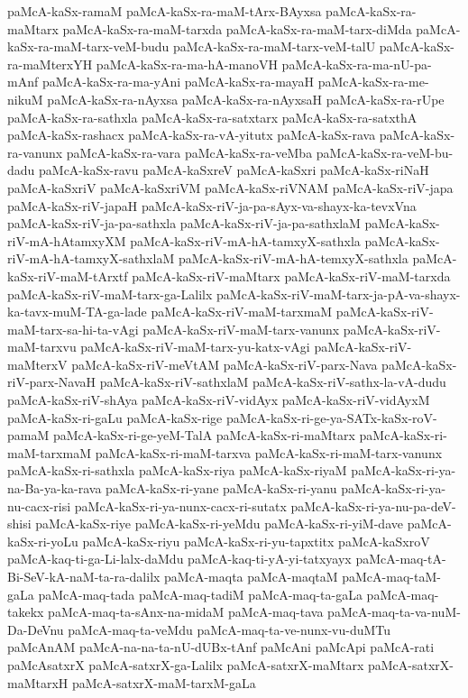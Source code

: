 {paMcA-kaSx-ramaM
paMcA-kaSx-ra-maM-tArx-BAyxsa
paMcA-kaSx-ra-maMtarx
paMcA-kaSx-ra-maM-tarxda
paMcA-kaSx-ra-maM-tarx-diMda
paMcA-kaSx-ra-maM-tarx-veM-budu
paMcA-kaSx-ra-maM-tarx-veM-talU
paMcA-kaSx-ra-maMterxYH
paMcA-kaSx-ra-ma-hA-manoVH
paMcA-kaSx-ra-ma-nU-pa-mAnf
paMcA-kaSx-ra-ma-yAni
paMcA-kaSx-ra-mayaH
paMcA-kaSx-ra-me-nikuM
paMcA-kaSx-ra-nAyxsa
paMcA-kaSx-ra-nAyxsaH
paMcA-kaSx-ra-rUpe
paMcA-kaSx-ra-sathxla
paMcA-kaSx-ra-satxtarx
paMcA-kaSx-ra-satxthA
paMcA-kaSx-rashacx
paMcA-kaSx-ra-vA-yitutx
paMcA-kaSx-rava
paMcA-kaSx-ra-vanunx
paMcA-kaSx-ra-vara
paMcA-kaSx-ra-veMba
paMcA-kaSx-ra-veM-bu-dadu
paMcA-kaSx-ravu
paMcA-kaSxreV
paMcA-kaSxri
paMcA-kaSx-riNaH
paMcA-kaSxriV
paMcA-kaSxriVM
paMcA-kaSx-riVNAM
paMcA-kaSx-riV-japa
paMcA-kaSx-riV-japaH
paMcA-kaSx-riV-ja-pa-sAyx-va-shayx-ka-tevxVna
paMcA-kaSx-riV-ja-pa-sathxla
paMcA-kaSx-riV-ja-pa-sathxlaM
paMcA-kaSx-riV-mA-hAtamxyXM
paMcA-kaSx-riV-mA-hA-tamxyX-sathxla
paMcA-kaSx-riV-mA-hA-tamxyX-sathxlaM
paMcA-kaSx-riV-mA-hA-temxyX-sathxla
paMcA-kaSx-riV-maM-tArxtf
paMcA-kaSx-riV-maMtarx
paMcA-kaSx-riV-maM-tarxda
paMcA-kaSx-riV-maM-tarx-ga-Lalilx
paMcA-kaSx-riV-maM-tarx-ja-pA-va-shayx-ka-tavx-muM-TA-ga-lade
paMcA-kaSx-riV-maM-tarxmaM
paMcA-kaSx-riV-maM-tarx-sa-hi-ta-vAgi
paMcA-kaSx-riV-maM-tarx-vanunx
paMcA-kaSx-riV-maM-tarxvu
paMcA-kaSx-riV-maM-tarx-yu-katx-vAgi
paMcA-kaSx-riV-maMterxV
paMcA-kaSx-riV-meVtAM
paMcA-kaSx-riV-parx-Nava
paMcA-kaSx-riV-parx-NavaH
paMcA-kaSx-riV-sathxlaM
paMcA-kaSx-riV-sathx-la-vA-dudu
paMcA-kaSx-riV-shAya
paMcA-kaSx-riV-vidAyx
paMcA-kaSx-riV-vidAyxM
paMcA-kaSx-ri-gaLu
paMcA-kaSx-rige
paMcA-kaSx-ri-ge-ya-SATx-kaSx-roV-pamaM
paMcA-kaSx-ri-ge-yeM-TalA
paMcA-kaSx-ri-maMtarx
paMcA-kaSx-ri-maM-tarxmaM
paMcA-kaSx-ri-maM-tarxva
paMcA-kaSx-ri-maM-tarx-vanunx
paMcA-kaSx-ri-sathxla
paMcA-kaSx-riya
paMcA-kaSx-riyaM
paMcA-kaSx-ri-ya-na-Ba-ya-ka-rava
paMcA-kaSx-ri-yane
paMcA-kaSx-ri-yanu
paMcA-kaSx-ri-ya-nu-cacx-risi
paMcA-kaSx-ri-ya-nunx-cacx-ri-sutatx
paMcA-kaSx-ri-ya-nu-pa-deV-shisi
paMcA-kaSx-riye
paMcA-kaSx-ri-yeMdu
paMcA-kaSx-ri-yiM-dave
paMcA-kaSx-ri-yoLu
paMcA-kaSx-riyu
paMcA-kaSx-ri-yu-tapxtitx
paMcA-kaSxroV
paMcA-kaq-ti-ga-Li-lalx-daMdu
paMcA-kaq-ti-yA-yi-tatxyayx
paMcA-maq-tA-Bi-SeV-kA-naM-ta-ra-dalilx
paMcA-maqta
paMcA-maqtaM
paMcA-maq-taM-gaLa
paMcA-maq-tada
paMcA-maq-tadiM
paMcA-maq-ta-gaLa
paMcA-maq-takekx
paMcA-maq-ta-sAnx-na-midaM
paMcA-maq-tava
paMcA-maq-ta-va-nuM-Da-DeVnu
paMcA-maq-ta-veMdu
paMcA-maq-ta-ve-nunx-vu-duMTu
paMcAnAM
paMcA-na-na-ta-nU-dUBx-tAnf
paMcAni
paMcApi
paMcA-rati
paMcAsatxrX
paMcA-satxrX-ga-Lalilx
paMcA-satxrX-maMtarx
paMcA-satxrX-maMtarxH
paMcA-satxrX-maM-tarxM-gaLa
}

